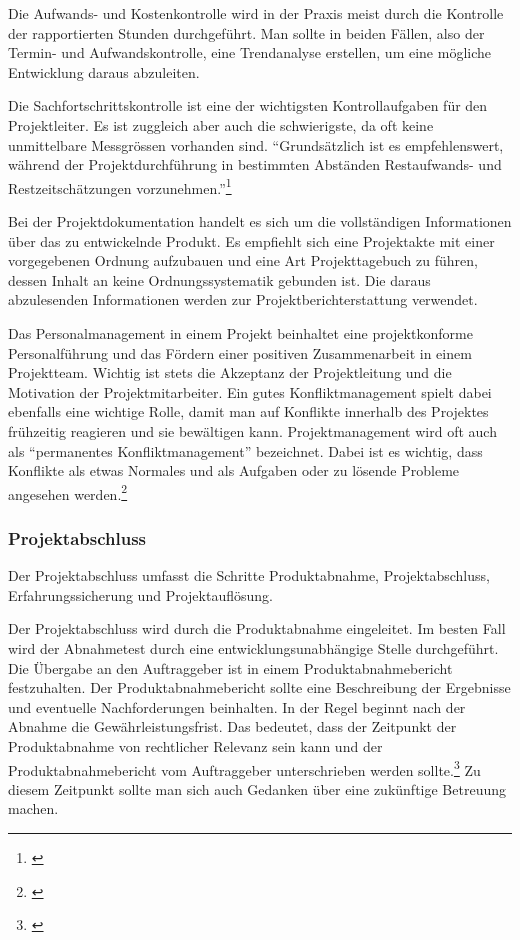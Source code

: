 Die Aufwands- und Kostenkontrolle wird in der Praxis meist durch die Kontrolle
der rapportierten Stunden durchgeführt. Man sollte in beiden Fällen, also der
Termin- und Aufwandskontrolle, eine Trendanalyse erstellen, um eine mögliche
Entwicklung daraus abzuleiten.

Die Sachfortschrittskontrolle ist eine der wichtigsten Kontrollaufgaben für
den Projektleiter. Es ist zuggleich aber auch die schwierigste, da oft keine
unmittelbare Messgrössen vorhanden sind. ``Grundsätzlich ist es empfehlenswert,
während der Projektdurchführung in bestimmten Abständen Restaufwands- und
Restzeitschätzungen vorzunehmen.''\footnote{\citealp*[S. 16]{burghardt2007einfuehrung}}

Bei der Projektdokumentation handelt es sich um die vollständigen Informationen
über das zu entwickelnde Produkt. Es empfiehlt sich eine Projektakte mit einer
vorgegebenen Ordnung aufzubauen und eine Art Projekttagebuch zu führen, dessen
Inhalt an keine Ordnungssystematik gebunden ist. Die daraus abzulesenden
Informationen werden zur Projektberichterstattung verwendet.

Das Personalmanagement in einem Projekt beinhaltet eine projektkonforme
Personalführung und das Fördern einer positiven Zusammenarbeit in einem
Projektteam. Wichtig ist stets die Akzeptanz der Projektleitung und die 
Motivation der Projektmitarbeiter. Ein gutes Konfliktmanagement spielt
dabei ebenfalls eine wichtige Rolle, damit man auf Konflikte innerhalb des
Projektes frühzeitig reagieren und sie bewältigen kann. Projektmanagement
wird oft auch als ``permanentes Konfliktmanagement'' bezeichnet. Dabei ist es
wichtig, dass Konflikte als etwas Normales und als Aufgaben oder zu lösende 
Probleme angesehen werden.\footnote{\citealp*[S. 119]{kessler2004projektmanagement}}

\subsubsection{Projektabschluss}
Der Projektabschluss umfasst die Schritte Produktabnahme, Projektabschluss,
Erfahrungssicherung und Projektauflösung.

Der Projektabschluss wird durch die Produktabnahme eingeleitet. Im besten Fall
wird der Abnahmetest durch eine entwicklungsunabhängige Stelle durchgeführt.
Die Übergabe an den Auftraggeber ist in einem Produktabnahmebericht festzuhalten.
Der Produktabnahmebericht sollte eine Beschreibung der Ergebnisse und eventuelle
Nachforderungen beinhalten. In der Regel beginnt nach der Abnahme die
Gewährleistungsfrist. Das bedeutet, dass der Zeitpunkt der Produktabnahme von
rechtlicher Relevanz sein kann und der Produktabnahmebericht vom Auftraggeber
unterschrieben werden sollte.\footnote{\citealp*[Vgl.][S. 86]{cronenbroeck2004handbuch}}
Zu diesem Zeitpunkt sollte man sich auch Gedanken über eine zukünftige Betreuung
machen.

